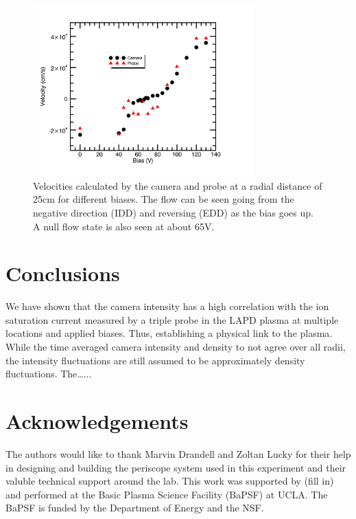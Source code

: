 \documentclass[%
 reprint,
 amsmath,amssymb,
 aps,
]{revtex4-1}
\begin{document}
\begin{figure}[!htbp]
\centerline{}
\includegraphics[width=8.5cm]{plot_Velocity_at_25cm_camAt23cm_biasScan}
\caption{\label{fig:plot_Velocity_at_26cm_camAt23cm_biasScan} Velocities calculated by the camera and probe at a radial distance of 25cm for different biases.  The flow can be seen going from the negative direction (IDD) and reversing (EDD) as the bias goes up.  A null flow state is also seen at about 65V. }
\end{figure}

%
%
%
%
\section{\label{sec:level1}Conclusions}

We have shown that the camera intensity has a high correlation with the ion saturation current measured by a triple probe in the LAPD plasma at multiple locations and applied biases.  Thus, establishing a physical link to the plasma.  While the time averaged camera intensity and density to not agree over all radii, the intensity fluctuations are still assumed to be approximately density fluctuations.  The…...    
 
%
%
%
%
\section{\label{sec:level1}Acknowledgements}
The authors would like to thank Marvin Drandell and Zoltan Lucky for their help in designing and building the periscope system used in this experiment and their valuble technical support around the lab.  This work was supported by (fill in) and performed at the Basic Plasma Science Facility (BaPSF) at UCLA.  The BaPSF is funded by the Department of Energy and the NSF. 
\end{document}
